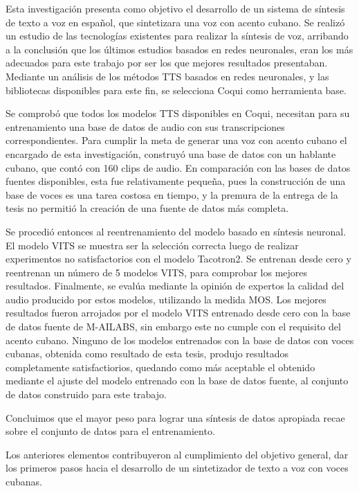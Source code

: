 \begin{conclusions}    
Esta investigación presenta como objetivo el desarrollo de un sistema de síntesis de texto a voz en español, que sintetizara una voz con acento cubano. Se realizó un estudio de las tecnologías existentes para realizar la síntesis de voz, arribando a la conclusión que los últimos estudios basados en redes neuronales, eran los más adecuados para este trabajo por ser los que mejores resultados presentaban. Mediante un análisis de los métodos TTS basados en redes neuronales, y las bibliotecas disponibles para este fin, se selecciona Coqui como herramienta base. 

Se comprobó que todos los modelos TTS disponibles en Coqui, necesitan para su entrenamiento una base de datos de audio con sus transcripciones correspondientes. Para cumplir la meta de generar una voz con acento cubano el encargado de esta investigación, construyó una base de datos con un hablante cubano, que contó con 160 clips de audio. En comparación con las bases de datos fuentes disponibles, esta fue relativamente pequeña, pues la construcción de una base de voces es una tarea costosa en tiempo, y la premura de la entrega de la tesis no permitió la creación de una fuente de datos más completa.

Se procedió entonces al reentrenamiento del modelo basado en síntesis neuronal. El modelo VITS se muestra ser la selección correcta luego de realizar experimentos no satisfactorios con el modelo Tacotron2. Se entrenan desde cero y reentrenan un número de 5 modelos VITS, para comprobar los mejores resultados. Finalmente, se evalúa mediante la opinión de expertos la calidad del audio producido por estos modelos, utilizando la medida MOS. Los mejores resultados fueron arrojados por el modelo VITS entrenado desde cero con la base de datos fuente de M-AILABS, sin embargo este no cumple con el requisito del acento cubano. Ninguno de los modelos entrenados con la base de datos con voces cubanas, obtenida como resultado de esta tesis, produjo resultados completamente satisfactiorios, quedando como más aceptable el obtenido mediante el ajuste del modelo entrenado con la base de datos fuente, al conjunto de datos construido para este trabajo.
 
Concluimos que el mayor peso para lograr una síntesis de datos apropiada recae sobre el conjunto de datos para el entrenamiento.

Los anteriores elementos contribuyeron al cumplimiento del objetivo general, dar los primeros pasos hacia el desarrollo de un sintetizador de texto a voz con voces cubanas. 
    
    
   
\end{conclusions}
